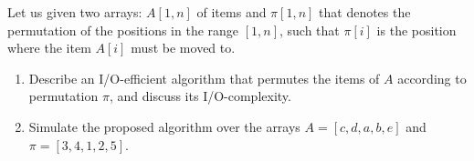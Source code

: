 \exercise

Let us given two arrays: $A[1,n]$ of items and $\pi[1,n]$ that denotes the permutation of the positions in the range $[1,n]$, such that $\pi[i]$ is the position where the item $A[i]$ must be moved to.
%
\begin{enumerate}

  \item Describe an I/O-efficient algorithm that permutes the items of $A$
  according to permutation $\pi$, and discuss its I/O-complexity.

  \item Simulate the proposed algorithm  over the arrays $A = [c, d, a, b, e]$
  and $\pi = [3, 4, 1, 2, 5]$.

\end{enumerate}

\solution

